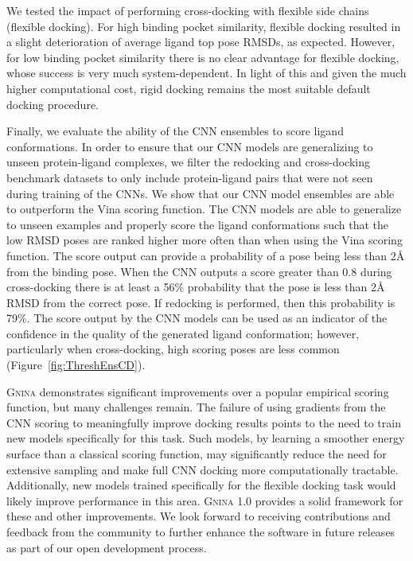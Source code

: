 \documentclass[linenumbers,doublespacing]{bmcart}
\begin{document}
We tested the impact of performing cross-docking with flexible side chains (flexible docking). For high binding pocket similarity, flexible docking resulted in a slight deterioration of average ligand top pose RMSDs, as expected. However, for low binding pocket similarity there is no clear advantage for flexible docking, whose success is very much system-dependent. In light of this and given the much higher computational cost, rigid docking remains the most suitable default docking procedure.

Finally, we evaluate the ability of the CNN ensembles to score ligand conformations. In order to ensure that our CNN models are generalizing to unseen protein-ligand complexes, we filter the redocking and cross-docking benchmark datasets to only include protein-ligand pairs that were not seen during training of the CNNs. We show that our CNN model ensembles are able to outperform the Vina scoring function. The CNN models are able to generalize to unseen examples and properly score the ligand conformations such that the low RMSD poses are ranked higher more often than when using the Vina scoring function. The score output can provide a probability of a pose being less than 2{\AA} from the binding pose. When the CNN outputs a score greater than 0.8 during cross-docking there is at least a 56\% probability that the pose is less than 2{\AA} RMSD from the correct pose. If redocking is performed, then this probability is 79\%. The score output by the CNN models can be used as an indicator of the confidence in the quality of the generated ligand conformation; however, particularly when cross-docking, high scoring poses are less common (Figure~\ref{fig:ThreshEnsCD}).

\textsc{Gnina} demonstrates significant improvements over a popular empirical scoring function, but many challenges remain.  The failure of using gradients from the CNN scoring to meaningfully improve docking results points to the need to train new models specifically for this task.  Such models, by learning a smoother energy surface than a classical scoring function, may significantly reduce the need for extensive sampling and make full CNN docking more computationally tractable.  Additionally, new models trained specifically for the flexible docking task would likely improve performance in this area.  \textsc{Gnina} 1.0 provides a solid framework for these and other improvements. We look forward to receiving contributions and feedback from the community to further enhance the software in future releases as part of our open development process.
\end{document}
